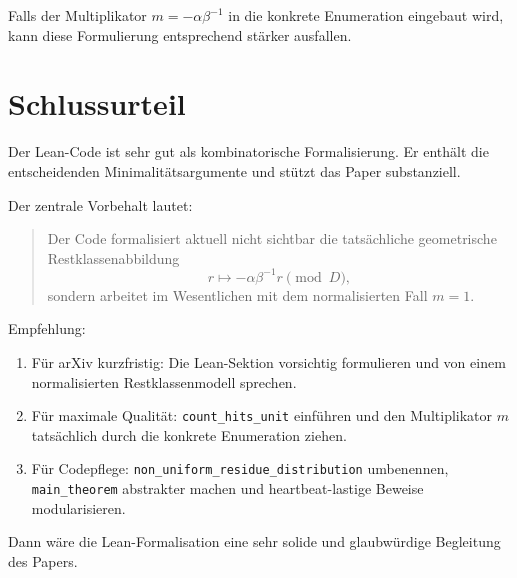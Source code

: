 \documentclass[11pt]{article}
\begin{document}
Falls der Multiplikator \(m=-\alpha\beta^{-1}\) in die konkrete Enumeration eingebaut wird, kann diese Formulierung entsprechend stärker ausfallen.

\section*{Schlussurteil}

Der Lean-Code ist sehr gut als kombinatorische Formalisierung. Er enthält die entscheidenden Minimalitätsargumente und stützt das Paper substanziell.

Der zentrale Vorbehalt lautet:

\begin{quote}
Der Code formalisiert aktuell nicht sichtbar die tatsächliche geometrische Restklassenabbildung
\[
    r \mapsto -\alpha\beta^{-1}r \pmod D,
\]
sondern arbeitet im Wesentlichen mit dem normalisierten Fall \(m=1\).
\end{quote}

Empfehlung:

\begin{enumerate}[leftmargin=2em]
    \item Für arXiv kurzfristig: Die Lean-Sektion vorsichtig formulieren und von einem normalisierten Restklassenmodell sprechen.
    \item Für maximale Qualität: \texttt{count\_hits\_unit} einführen und den Multiplikator \(m\) tatsächlich durch die konkrete Enumeration ziehen.
    \item Für Codepflege: \texttt{non\_uniform\_residue\_distribution} umbenennen, \texttt{main\_theorem} abstrakter machen und heartbeat-lastige Beweise modularisieren.
\end{enumerate}

Dann wäre die Lean-Formalisation eine sehr solide und glaubwürdige Begleitung des Papers.
\end{document}
